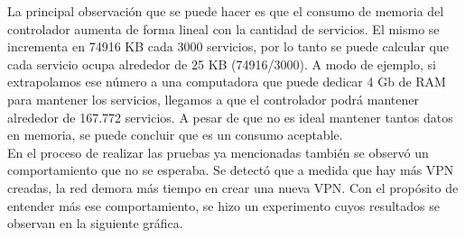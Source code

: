La principal observación que se puede hacer es que el consumo de memoria del controlador aumenta de forma lineal con la cantidad de servicios. El mismo se incrementa en 74916 KB cada 3000 servicios, por lo tanto se puede calcular que cada servicio ocupa alrededor de 25 KB (74916/3000). A modo de ejemplo, si extrapolamos ese número a una computadora que puede dedicar 4 Gb de RAM para mantener los servicios, llegamos a que el controlador podrá mantener alrededor de 167.772 servicios. A pesar de que no es ideal mantener tantos datos en memoria, se puede concluir que es un consumo aceptable. \\

En el proceso de realizar las pruebas ya mencionadas también se observó un comportamiento que no se esperaba. Se detectó que a medida que hay más VPN creadas, la red demora más tiempo en crear una nueva VPN. Con el propósito de entender más ese comportamiento, se hizo un experimento cuyos resultados se observan en la siguiente gráfica. \\ \\

